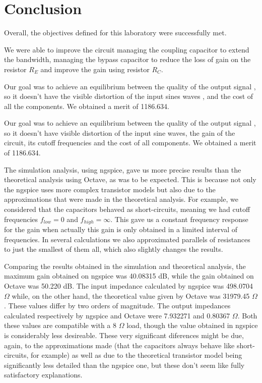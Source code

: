\section{Conclusion}
\label{sec:conclusion}


Overall, the objectives defined for this laboratory were successfully met.

We were able to improve the circuit managing the coupling capacitor to extend the bandwidth, managing the bypass capacitor to reduce the loss of gain on the resistor $R_E$ and improve the gain using resistor $R_C$.

Our goal was to achieve an equilibrium between the quality of the output signal , so it doesn't have the visible distortion of the input sines waves , and the cost of all the components. We obtained a merit of 1186.634.

Our goal was to achieve an equilibrium between the quality of the output signal , so it doesn't have visible distortion of the input sine waves, the gain of the circuit, its cutoff frequencies and the cost of all components. We obtained a merit of 1186.634.

The simulation analysis, using ngspice, gave us more precise results than the theoretical analysis using Octave, as was to be expected. This is because not only the ngspice uses more complex transistor models but also due to the approximations that were made in the theoretical analysis. For example, we considered that the capacitors behaved as short-circuits, meaning we had cutoff frequencies $f_{low}=0$ and $f_{high}= \infty$. This gave us a constant frequency response for the gain when actually this gain is only obtained in a limited interval of frequencies.  In several calculations we also approximated parallels of resistances to just the smallest of them all, which also slightly changes the results.

Comparing the results obtained in the simulation and theoretical analysis, the maximum gain obtained on ngspice was 40.08315 dB, while the gain obtained on Octave was 50.220 dB. The input impedance calculated by ngspice was 498.0704 $\Omega$ while, on the other hand, the theoretical value  given by Octave was 31979.45 $\Omega$. These values differ by two orders of magnitude. The output impedances calculated respectively by ngspice and Octave were 7.932271 and 0.80367 $\Omega$. Both these values are compatible with a 8 $\Omega$ load, though the value obtained in ngspice is considerably less desireable. These very significant diferences might be due, again, to the approximations made (that the capacitors always behave like short-circuits, for example) as well as due to the theoretical transistor model being significantly less detailed than the ngspice one, but these don't seem like fully satisfactory explanations.



